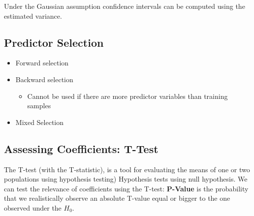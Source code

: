 \documentclass[../Main.tex]{subfiles}
\begin{document}

Under the Gaussian assumption confidence intervals can be computed using the estimated variance. 

\subsection{Predictor Selection}
\begin{itemize}
    \item Forward selection
    \item Backward selection
    \begin{itemize}
        \item Cannot be used if there are more predictor variables than training samples
    \end{itemize}
    \item Mixed Selection
\end{itemize}

\subsection{Assessing Coefficients: T-Test}
The T-test (with the T-statistic), is a tool for evaluating the means of one or two populations using hypothesis testing) Hypothesis tests using null hypothesis. We can test the relevance of coefficients using the T-test:
\textbf{P-Value} is the probability that we realistically observe an absolute T-value equal or bigger to the one observed under the \(H_0\).
\end{document}
